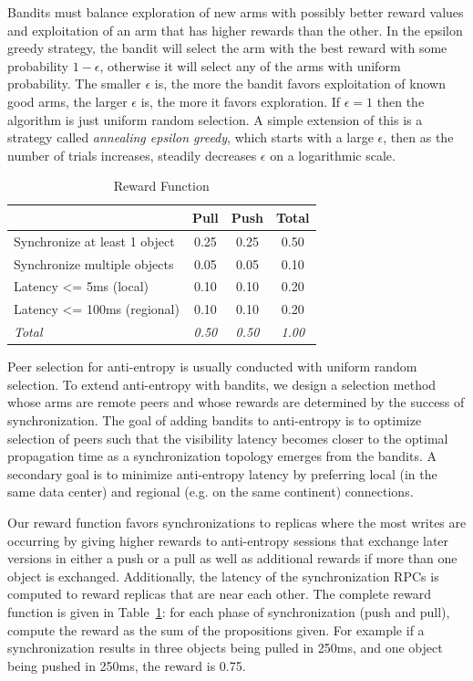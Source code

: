 Bandits must balance exploration of new arms with possibly better reward
values and exploitation of an arm that has higher rewards than the other.
In the epsilon greedy strategy, the bandit will select the arm with the best
reward with some probability $1-\epsilon$, otherwise it will select any of the
arms with uniform probability.
The smaller $\epsilon$ is, the more the bandit favors exploitation of known
good arms, the larger $\epsilon$ is, the more it favors exploration.
If $\epsilon=1$ then the algorithm is just uniform random selection.
A simple extension of this is a strategy called \emph{annealing epsilon greedy}, which starts with a large $\epsilon$, then as the number of trials increases, steadily decreases
$\epsilon$ on a logarithmic scale.

\begin{table}[]
\centering
\begin{tabular}{@{}l c c c @{}}
\toprule
& \textbf{Pull} & \textbf{Push} & \textbf{Total} \\
\midrule
Synchronize at least 1 object & 0.25 & 0.25 & 0.50 \\
Synchronize multiple objects  & 0.05 & 0.05 & 0.10 \\
Latency <= 5ms (local)        & 0.10 & 0.10 & 0.20 \\
Latency <= 100ms (regional)   & 0.10 & 0.10 & 0.20 \\
\midrule
\textit{Total} & \textit{0.50} & \textit{0.50} & \textit{1.00} \\
\bottomrule
\end{tabular}
\caption{Reward Function}
\label{tab:rewards}
\end{table}

Peer selection for anti-entropy is usually conducted with uniform random
selection.
To extend anti-entropy with bandits, we design a selection method whose arms
are remote peers and whose rewards are determined by the success of
synchronization.
The goal of adding bandits to anti-entropy is to optimize selection of peers
such that the visibility latency becomes closer to the optimal propagation
time as a synchronization topology emerges from the bandits.
A secondary goal is to minimize anti-entropy latency by preferring local (in
the same data center) and regional (e.g. on the same continent) connections.

Our reward function favors synchronizations to replicas where the most writes
are occurring by giving higher rewards to anti-entropy sessions that exchange
later versions in either a push or a pull as well as additional rewards if
more than one object is exchanged.
Additionally, the latency of the synchronization RPCs is computed to reward
replicas that are near each other.
The complete reward function is given in Table~\ref{tab:rewards}: for each
phase of synchronization (push and pull), compute the reward as the sum of the
propositions given.
For example if a synchronization results in three objects being pulled in 250ms,
and one object being pushed in 250ms, the reward is 0.75.

